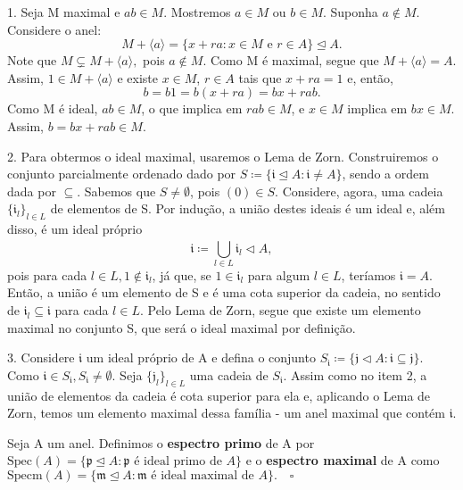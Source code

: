 \documentclass[AlgebraII/algebraII_notes.tex]{subfiles}
\begin{document}
\begin{proof*}
	1. Seja M maximal e \(ab\in M.\) Mostremos \(a\in M\) ou \(b\in M\). Suponha
	\(a\not\in M\). Considere o anel:
	\[
		M + \langle a \rangle = \{x+ra: x\in M\text{ e }r\in A\} \trianglelefteq{A}.
	\]
	Note que \(M\subsetneq{M + \langle a \rangle},\) pois \(a\not\in M.\) Como M é maximal, segue que
	\(M + \langle a \rangle = A.\) Assim, \(1\in M + \langle a \rangle\) e existe \(x\in M\), \(r\in A\)
	tais que \(x + ra = 1\) e, então,
	\[
		b = b1 = b(x+ra) = bx + rab.
	\]
	Como M é ideal, \(ab\in M\), o que implica em \(rab\in M\), e \(x\in M\) implica em \(bx\in M\).
	Assim, \(b = bx + rab\in M\).

	2. Para obtermos o ideal maximal, usaremos o Lema de Zorn. Construiremos o conjunto parcialmente ordenado
	dado por \(S\coloneqq \{\mathfrak{i}\trianglelefteq{A}: \mathfrak{i}\neq A\}\), sendo a ordem dada por \(\subseteq{}.\)
	Sabemos que \(S \neq\emptyset\), pois \((0)\in S.\) Considere, agora, uma cadeia \(\{\mathfrak{i}_{l}\}_{l\in L}\) de elementos
	de S. Por indução, a união destes ideais é um ideal e, além disso, é um ideal próprio
	\[
		\mathfrak{i}\coloneqq \bigcup_{l\in L}^{}{\mathfrak{i}_{l}}\vartriangleleft{A},
	\]
	pois para cada \(l\in L, 1\not\in \mathfrak{i}_{l}\), já que, se \(1\in \mathfrak{i}_{l}\) para algum \(l\in L\), teríamos
	\(\mathfrak{i} = A\). Então, a união é um elemento de S e é uma cota superior da cadeia, no sentido de \(\mathfrak{i}_{l}\subseteq{\mathfrak{i}}\)
	para cada \(l\in L.\) Pelo Lema de Zorn, segue que existe um elemento maximal no conjunto S, que será o ideal maximal por definição.

	3. Considere \(\mathfrak{i}\) um ideal próprio de A e defina o conjunto \(S_{\mathfrak{i}}\coloneqq \{\mathfrak{j}\vartriangleleft{A}:\mathfrak{i}\subseteq{\mathfrak{j}}\}\).
	Como \(\mathfrak{i}\in S_{\mathfrak{i}}, S_{\mathfrak{i}}\neq\emptyset.\) Seja \(\{\mathfrak{j}_{l}\}_{l\in L}\) uma cadeia de \(S_{\mathfrak{i}}.\)
	Assim como no item 2, a união de elementos da cadeia é cota superior para ela e, aplicando o Lema de Zorn, temos um elemento
	maximal dessa família - um anel maximal que contém \(\mathfrak{i}.\)
	\qedsymbol
\end{proof*}
\begin{def*}
	Seja A um anel. Definimos o \textbf{espectro primo} de A por \(\mathrm{Spec}(A) = \{\mathfrak{p}\trianglelefteq{A}: \mathfrak{p}\text{ é ideal primo de } A\}\)
	e o \textbf{espectro maximal} de A como \(\mathrm{Specm}(A) = \{\mathfrak{m}\trianglelefteq{A}:\mathfrak{m} \text{ é ideal maximal de } A\}.\quad\square\)
\end{def*}
\end{document}
